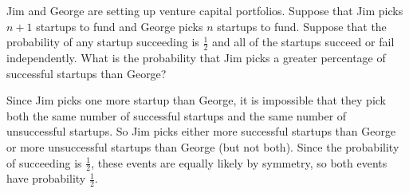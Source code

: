 \question Jim and George are setting up venture capital portfolios. 
Suppose that Jim picks $n + 1$ startups to fund and George picks $n$ 
startups to fund. Suppose that the probability of any startup succeeding 
is $\frac{1}{2}$  and all of the startups succeed or fail independently. 
What is the probability that Jim picks a greater percentage of successful startups than George?
\begin{solution}[5cm]
Since Jim picks one more startup than George, it is impossible that 
they pick both the same number of successful startups and the same 
number of unsuccessful startups. So Jim picks either more successful 
startups than George or more unsuccessful startups than George (but not 
both). Since the probability of
succeeding is $\frac{1}{2}$, these events are equally likely by symmetry, 
so both events have
probability $\frac{1}{2}$.
\end{solution}
